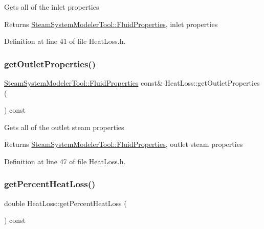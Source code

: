 Gets all of the inlet properties \begin{DoxyReturn}{Returns}
\hyperlink{struct_steam_system_modeler_tool_1_1_fluid_properties}{Steam\+System\+Modeler\+Tool\+::\+Fluid\+Properties}, inlet properties 
\end{DoxyReturn}


Definition at line 41 of file Heat\+Loss.\+h.

\mbox{\label{class_heat_loss_a3e483dda6f393d67d7a0f28bcd75e545}} 
\subsubsection{\texorpdfstring{get\+Outlet\+Properties()}{getOutletProperties()}}
{\footnotesize\ttfamily \hyperlink{struct_steam_system_modeler_tool_1_1_fluid_properties}{Steam\+System\+Modeler\+Tool\+::\+Fluid\+Properties} const\& Heat\+Loss\+::get\+Outlet\+Properties (\begin{DoxyParamCaption}{ }\end{DoxyParamCaption}) const\hspace{0.3cm}{\ttfamily [inline]}}

Gets all of the outlet steam properties \begin{DoxyReturn}{Returns}
\hyperlink{struct_steam_system_modeler_tool_1_1_fluid_properties}{Steam\+System\+Modeler\+Tool\+::\+Fluid\+Properties}, outlet steam properties 
\end{DoxyReturn}


Definition at line 47 of file Heat\+Loss.\+h.

\mbox{\label{class_heat_loss_acbbf01db5cde157057e4d766cab22382}} 
\subsubsection{\texorpdfstring{get\+Percent\+Heat\+Loss()}{getPercentHeatLoss()}}
{\footnotesize\ttfamily double Heat\+Loss\+::get\+Percent\+Heat\+Loss (\begin{DoxyParamCaption}{ }\end{DoxyParamCaption}) const\hspace{0.3cm}{\ttfamily [inline]}}

